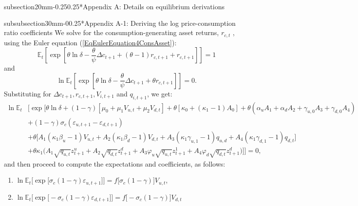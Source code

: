 \documentclass[11pt]{article}
\makeatletter
\renewcommand\subsubsection{\@startsection%
    {subsubsection}{3}{0mm}{-0\baselineskip}{0.25\baselineskip}{\itshape\large}}
\renewcommand\subsection{\@startsection%
    {subsection}{2}{0mm}{-0.25\baselineskip}{0.25\baselineskip}{\bfseries\large}}
\makeatother
\begin{document}
\begin{small}
\subsection*{Appendix A: Details on equilibrium derivations}

\subsubsection*{Appendix A-1: Deriving the log price-consumption ratio coefficients}
We solve for the consumption-generating asset returns, $r_{c,t}$%
, using the Euler equation (\ref{EqEulerEquation4ConsAsset}):
\begin{equation*}
\mathbb{E}_t\left[\exp\left[\theta\ln\delta-\frac{\theta}{\psi}\Delta
c_{t+1}+(\theta-1)r_{c, t+1}+r_{c,t+1}\right]\right]=1
\end{equation*}
and
\begin{equation*}
\ln\mathbb{E}_t\left[\exp\left[\theta\ln\delta-\frac{\theta}{\psi}\Delta
c_{t+1}+\theta r_{c, t+1}\right]\right]=0.
\end{equation*}
Substituting for $\Delta c_{t+1}, r_{c, t+1}, V_{i, t+1}$ and $q_{i, t+1}$,
we get:
\begin{equation}
\begin{split}
\ln\mathbb{E}_t&\Bigg[\exp\Big[\theta\ln\delta+(1-\gamma)\left[%
\mu_0+\mu_1V_{u,t}+\mu_2V_{d,t}\right]+\theta[\kappa_0+(\kappa_1-1)A_0]%
+\theta(\alpha_uA_1+\alpha_dA_2+\gamma_{u,0}A_3+\gamma_{d,0}A_4) \\
&+(1-\gamma)\sigma_c(\varepsilon_{u,t+1}-\varepsilon_{d,t+1}) \\
&+\theta\Big[A_1(\kappa_1\beta_u-1)V_{u,t}+A_2(\kappa_1%
\beta_d-1)V_{d,t}+A_3(\kappa_1\gamma_{u,1}-1)q_{u,d}+A_4(\kappa_1%
\gamma_{d,1}-1)q_{d,t}\Big] \\
&+\theta\kappa_1\bigg(A_1\sqrt{q_{u,t}}z^u_{t+1}+A_2\sqrt{q_{d,t}}%
z^d_{t+1}+A_3\varphi_u\sqrt{q_{u,t}}z^1_{t+1}+A_4\varphi_d\sqrt{q_{d,t}}%
z^d_{t+1}\bigg)\bigg]\Bigg]=0,
\end{split}%
\end{equation}
and then proceed to compute the expectations and coefficients, as follows:

\begin{enumerate}
\item $\ln\mathbb{E}_t\Bigg[\exp\bigg[\sigma_c(1-\gamma)\varepsilon_{u,t+1}%
\bigg]\Bigg]=f\big[\sigma_c(1-\gamma)\big]V_{u,t}$,

\item $\ln\mathbb{E}_t\Bigg[\exp\bigg[-\sigma_c(1-\gamma)\varepsilon_{d,t+1}%
\bigg]\Bigg]=f\big[-\sigma_c(1-\gamma)\big]V_{d,t}$


\end{enumerate}
\end{small}
\end{document}
